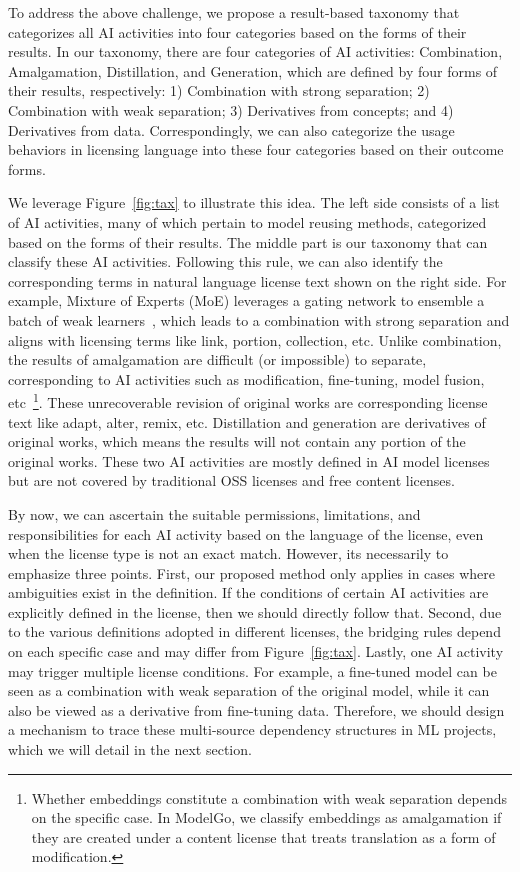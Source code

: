 To address the above challenge, we propose a result-based taxonomy that categorizes all AI activities into four categories based on the forms of their results. 
In our taxonomy, there are four categories of AI activities: Combination, Amalgamation, Distillation, and Generation, which are defined by four forms of their results, respectively: 1) Combination with strong separation; 2) Combination with weak separation; 3) Derivatives from concepts; and 4) Derivatives from data.
Correspondingly, we can also categorize the usage behaviors in licensing language into these four categories based on their outcome forms.

We leverage Figure~\ref{fig:tax} to illustrate this idea.
The left side consists of a list of AI activities, many of which pertain to model reusing methods, categorized based on the forms of their results.
The middle part is our taxonomy that can classify these AI activities.
Following this rule, we can also identify the corresponding terms in natural language license text shown on the right side.
For example, Mixture of Experts (MoE) leverages a gating network to ensemble a batch of weak learners~\cite{jacobs1991adaptive}, which leads to a combination with strong separation and aligns with licensing terms like link, portion, collection, etc.
Unlike combination, the results of amalgamation are difficult (or impossible) to separate, corresponding to AI activities such as modification, fine-tuning, model fusion, etc~\footnote{Whether embeddings constitute a combination with weak separation depends on the specific case. In ModelGo, we classify embeddings as amalgamation if they are created under a content license that treats translation as a form of modification.}. 
These unrecoverable revision of original works are corresponding license text like adapt, alter, remix, etc.
Distillation and generation are derivatives of original works, which means the results will not contain any portion of the original works. 
These two AI activities are mostly defined in AI model licenses but are not covered by traditional OSS licenses and free content licenses.

By now, we can ascertain the suitable permissions, limitations, and responsibilities for each AI activity based on the language of the license, even when the license type is not an exact match.
However, its necessarily to emphasize three points.
First, our proposed method only applies in cases where ambiguities exist in the definition. 
If the conditions of certain AI activities are explicitly defined in the license, then we should directly follow that.
Second, due to the various definitions adopted in different licenses, the bridging rules depend on each specific case and may differ from Figure~\ref{fig:tax}.
Lastly, one AI activity may trigger multiple license conditions. For example, a fine-tuned model can be seen as a combination with weak separation of the original model, while it can also be viewed as a derivative from fine-tuning data.
Therefore, we should design a mechanism to trace these multi-source dependency structures in ML projects, which we will detail in the next section.
 
